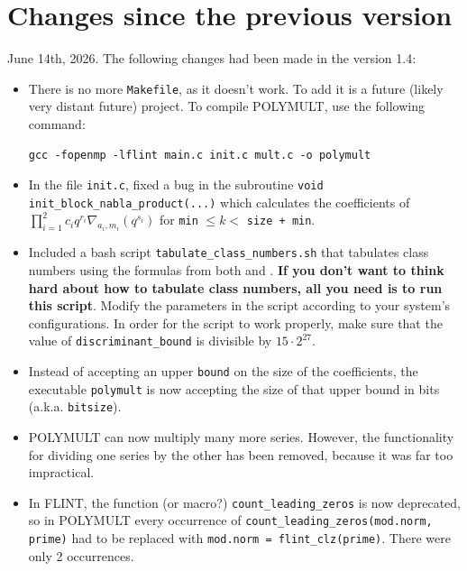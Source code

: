 \documentclass[a4paper,10pt]{article}
\newcommand{\code}{\lstinline}
\begin{document}
\section{Changes since the previous version}

June 14th, 2026. The following changes had been made in the version 1.4:

\begin{itemize}
\item There is no more \texttt{Makefile}, as it doesn't work. To add it is a future (likely very distant future) project. To compile POLYMULT, use the following command:

\begin{verbatim}
gcc -fopenmp -lflint main.c init.c mult.c -o polymult
\end{verbatim}

\item In the file \texttt{init.c}, fixed a bug in the subroutine \code{void init_block_nabla_product(...)} which calculates  the coefficients of $\prod_{i = 1}^2 c_iq^{r_i}\nabla_{a_i, m_i}(q^{s_i})$ for \texttt{min} $\leq k < $ \texttt{size + min}.

\item Included a bash script \code{tabulate_class_numbers.sh} that tabulates class numbers using the formulas from both \cite{mosunov} and \cite{bringmann-kane}. \textbf{If you don't want to think hard about how to tabulate class numbers, all you need is to run this script}. Modify the parameters in the script according to your system's configurations. In order for the script to work properly, make sure that the value of \code{discriminant_bound} is divisible by $15 \cdot 2^{27}$.

\item Instead of accepting an upper \code{bound} on the size of the coefficients, the executable \code{polymult} is now accepting the size of that upper bound in bits (a.k.a. \code{bitsize}).

\item POLYMULT can now multiply many more series. However, the functionality for dividing one series by the other has been removed, because it was far too impractical.

\item In FLINT, the function (or macro?) \code{count_leading_zeros} is now deprecated, so in POLYMULT every occurrence of \code{count_leading_zeros(mod.norm, prime)} had to be replaced with \code{mod.norm = flint_clz(prime)}. There were only 2 occurrences.


\end{itemize}
\end{document}
